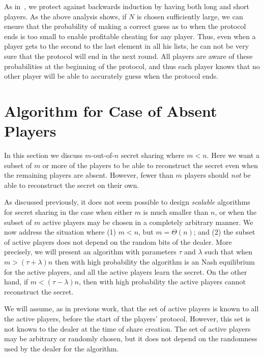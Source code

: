 \documentclass[12pt]{article}
\theoremstyle{definition}
\begin{document}
As in~\cite{kol2008games}, we protect against backwards induction by
having both long and short players.  As the above analysis shows, if
$N$ is chosen sufficiently large, we can ensure that the probability
of making a correct guess as to when the protocol ends is too small to
enable profitable cheating for any player.  Thus, even when a player
gets to the second to the last element in all his lists, he can not be
very sure that the protocol will end in the next round.  All players
are aware of these probabilities at the beginning of the protocol, and
thus each player knows that no other player will be able to accurately
guess when the protocol ends.


\section{Algorithm for Case of Absent Players}
\label{s:mofn}


In this section we discuss $m$-out-of-$n$ secret sharing where $m
<n$. Here we want a subset of $m$ or more of the players to be able to
reconstruct the secret even when the remaining players are absent. 
However, fewer than $m$ players should \emph{not} be able to
reconstruct the secret on their own.

As discussed previously, it does
not seem possible to design \emph{scalable} algorithms for secret
sharing in the case when either $m$ is much smaller than $n$, or when the
subset of $m$ active players may be chosen in a completely
arbitrary manner.  We now address the situation where (1) $m < n$,
but $m = \Theta(n)$; and (2) the subset of active players does not
depend on the random bits of the dealer.  More precisely, we will
present an algorithm with parameters $\tau$ and $\lambda$ such that when $m > (\tau + \lambda)n$ then with high
probability the algorithm is an Nash equilibrium for the
active players, and all the active players learn the secret. On the
other hand, if $m < (\tau -\lambda)n$,
then with high probability the active players cannot reconstruct the
secret.

We will assume, as in previous work, that the set of active players is
known to all the active players, before the start of the
players' protocol. However, this set is not known to the dealer at the time of 
share creation.   The set of active players may be arbitrary or randomly 
chosen, but it does
not depend on the randomness used by the dealer for the algorithm.
\end{document}
